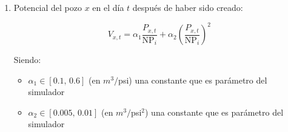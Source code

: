 \begin{enumerate}
 \item Potencial del pozo $x$ en el d\'ia $t$ despu\'es de haber sido creado:
 
 \begin{equation*}
  V_{x,t} = \alpha_1 \frac{P_{x,t}}{\text{NP}_i} + \alpha_2 \left(\frac{P_{x,t}}{\text{NP}_i}\right)^2
 \end{equation*}

 Siendo: 
 
 \begin{itemize}
  \item $\alpha_1\in[\text{0.1, 0.6}]$ (en $m^3/$psi) una constante que es par\'ametro del simulador
  \item $\alpha_2\in[\text{0.005, 0.01}]$ (en $m^3/$psi$^2$) una constante que es par\'ametro del simulador
 \end{itemize}

\end{enumerate}
